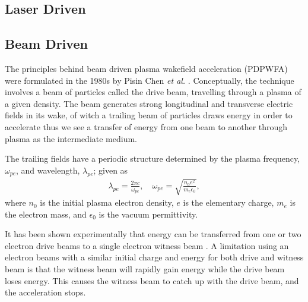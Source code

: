 

\subsection{Laser Driven}
\label{Int:LWFA}

\subsection{Beam Driven}
\label{Int:PDPWFA}

The principles behind beam driven plasma wakefield acceleration (PDPWFA) were formulated in the 1980s by Pisin Chen \emph{et al.} \cite{chen:1985}. Conceptually, the technique involves a beam of particles called the drive beam, travelling through a plasma of a given density. The beam generates strong longitudinal and transverse electric fields in its wake, of witch a trailing beam of particles draws energy in order to accelerate \dash thus we see a transfer of energy from one beam to another through plasma as the intermediate medium.

The trailing fields have a periodic structure determined by the plasma frequency, $\omega_{pe}$, and wavelength, $\lambda_{pe}$; given as
\begin{align}
    \lambda_{pe} = \frac{2\pi c}{\omega_{pe}}, \quad \omega_{pe} = \sqrt{\frac{n_{0}e^{2}}{m_{e}\epsilon_{0}}}, \label{EQ:PWFA:L0W0}
\end{align}
where $n_{0}$ is the initial plasma electron density, $e$ is the elementary charge, $m_{e}$ is the electron mass, and $\epsilon_{0}$ is the vacuum permittivity.

It has been shown experimentally that energy can be transferred from one or two electron drive beams to a single electron witness beam \cite{rosenzweig:1988, blumenfeld:2007, kallos:2008, litos:2014}. A limitation using an electron beams with a similar initial charge and energy for both drive and witness beam is that the witness beam will rapidly gain energy while the drive beam loses energy. This causes the witness beam to catch up with the drive beam, and the acceleration stops. 

